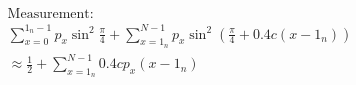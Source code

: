 \documentclass[border=0pt,varwidth]{standalone}
\begin{document}
\vspace*{1em}
\begin{gather*}
\text{Measurement:} \\
\sum^{1_n-1}_{x=0}p_x\sin^2\frac{\pi}{4}+
\sum^{N-1}_{x=1_n}p_x\sin^2(\frac{\pi}{4}+0.4c(x-1_n)) \\
\approx\frac{1}{2}+\sum^{N-1}_{x=1_n}0.4cp_x(x-1_n)
\end{gather*}
\vspace*{1em}
\end{document}
